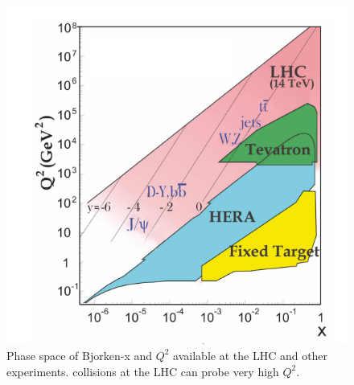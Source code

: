 \begin{figure}
\centering
\includegraphics[width=0.6\linewidth]{plots/SM/structure_probes.PNG}
\caption{Phase space of Bjorken-x and $Q^2$ available at the LHC and other experiments. \pp collisions at the LHC can probe very high $Q^2$. \protect\cite{PhysRevD.98.030001}}
\label{fig:sm:summary:xVsQ2}
\end{figure}